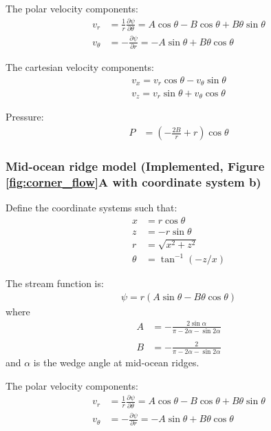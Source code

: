 \documentclass[a4paper,11pt]{article}
\begin{document}
The polar velocity components:
\begin{align}
 v_r&= \frac{1}{r}\frac{\partial\psi}{\partial\theta} = A\cos\theta-B\cos\theta+B\theta\sin\theta\\
v_\theta&=-\frac{\partial\psi}{\partial r} = -A\sin\theta+B\theta\cos\theta
 \end{align}
 
The cartesian velocity components:
\begin{align}
v_x = v_r\cos\theta - v_\theta\sin\theta\\
v_z = v_r\sin\theta + v_\theta\cos\theta
\end{align}

Pressure:
\begin{align}
P &= \left(-\frac{2B}{r}+r\right)\cos\theta
\end{align}

\subsubsection{Mid-ocean ridge model (Implemented, Figure \ref{fig:corner_flow}A with coordinate system b)}\label{moranalytic}
Define the coordinate systems such that:
\begin{align}
x &= r\cos\theta \\
z &= -r\sin\theta \\
r &= \sqrt{x^2+z^2}\\
\theta &= \tan^{-1}({-z/x})
\end{align}

The stream function is:
\begin{align}
\psi = r(A\sin\theta-B\theta\cos\theta)
\end{align}
where 
\begin{align}
A&=-\frac{\displaystyle 2\sin\alpha}{\displaystyle \pi-2\alpha-\sin2\alpha} \\
&\nonumber  \\
B&=-\frac{\displaystyle 2}{\displaystyle \pi-2\alpha-\sin2\alpha}
\end{align}
and $\alpha$ is the wedge angle at mid-ocean ridges.

The polar velocity components:
\begin{align}
 v_r&= \frac{1}{r}\frac{\partial\psi}{\partial\theta} = A\cos\theta-B\cos\theta+B\theta\sin\theta\\
v_\theta&=-\frac{\partial\psi}{\partial r} = -A\sin\theta+B\theta\cos\theta
 \end{align}
 
\end{document}
